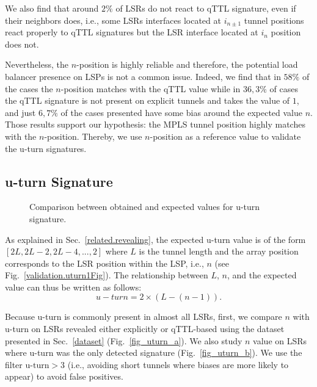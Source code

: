 We also find that around $2\%$ of LSRs do not react to qTTL signature, even if
their neighbors does, i.e., some LSRs interfaces located at $i_{n \pm 1}$
tunnel positions react properly to qTTL signatures but the LSR interface located
at $i_n$ position does not.

Nevertheless, the $n$-position is highly reliable and therefore, the potential
load balancer presence on LSPs is not a common issue. Indeed, we find that in
$58\%$ of the cases the $n$-position matches with the qTTL value while in
$36,3\%$ of cases the qTTL signature is not present on explicit tunnels and
takes the value of $1$, and just $6,7\%$ of the cases presented have some bias
around the expected value $n$. Those results support our hypothesis: the  MPLS
tunnel position highly matches with the $n$-position. Thereby, we use
$n$-position as a reference value to validate the u-turn signatures.

\subsection{u-turn Signature}\label{validation.uturn}
\begin{figure}[!t]
  \begin{center}    
\hspace{-0.3cm}      
  \end{center}
\vspace{-0.5cm}  
  \caption{Comparison between obtained and expected values for u-turn
  signature.}
  \label{validation.uturn.fig}
\end{figure}

As explained in Sec.~\ref{related.revealing},  the expected u-turn value is of
the form $[2L, 2L-2, 2L-4,..., 2]$ where $L$ is the tunnel length and the array
position corresponds to the LSR position within the LSP, i.e., $n$ (see
Fig.~\ref{validation.uturn1Fig}).  The relationship between $L$, $n$, and the
expected value can thus be written as follows:
\begin{equation}
u-turn = 2 \times (L - (n-1)) .
\label{eqn.uturn}
\end{equation}

Because u-turn is commonly present in almost all LSRs, first, we compare $n$
with u-turn on LSRs revealed either explicitly or qTTL-based using the dataset
presented in Sec.~\ref{dataset} (Fig.~\ref{fig_uturn_a}). We also study 
$n$ value on LSRs where u-turn was the only detected signature
(Fig.~\ref{fig_uturn_b}). We use the filter $\text{u-turn}>3$ (i.e., avoiding
short tunnels where biases are more likely to appear) to avoid false positives.

